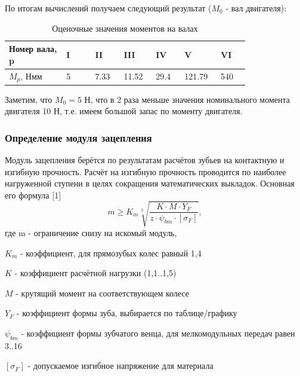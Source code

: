 \documentclass[14pt,a4paper,russian]{scrartcl}
\begin{document}
        По итогам вычислений получаем следующий результат (\( M_0 \) - вал двигателя):
        \begin{table}[h!]
            \begin{center}
                \begin{tabular}{p{0.2\linewidth}p{0.1\linewidth}p{0.1\linewidth}p{0.1\linewidth}p{0.1\linewidth}p{0.1\linewidth}p{0.1\linewidth}}
                    \hline
                    Номер вала, p & I & II & III & IV & V & VI \\
                    \hline
                    \( M_p \), Нмм & 5 & 7.33 & 11.52 & 29.4 & 121.79 & 540 \\
                    \hline
                \end{tabular}
                \caption{Оценочные значения моментов на валах}\label{tab:moments__shaft_estimate}
            \end{center}
        \end{table}

        Заметим, что \( M_0=5 \) Н, что в 2 раза меньше значения номинального момента двигателя 10 Н,
        т.е. имеем большой запас по моменту двигателя.

    \subsubsection{Определение модуля зацепления}
        Модуль зацепления берётся по результатам расчётов зубьев на контактную и
        изгибную прочность. Расчёт на изгибную прочность проводится по наиболее нагруженной ступени в целях
        сокращения математических выкладок. Основная его формула [1]
        \[ m \geq K_m\sqrt[3]{\frac{K\cdot M\cdot Y_F}{z\cdot\psi_{bm}\cdot[\sigma_F]}}, \]
        где m - ограничение снизу на искомый модуль,\par
            \( K_m \) - коэффициент, для прямозубых колес равный 1,4\par 
            \( K \) - коэффициент расчётной нагрузки (1,1..1,5)\par
            \( M \) - крутящий момент на соответствующем колесе\par
            \( Y_F \) - коэффициент формы зуба, выбирается по таблице/графику\par
            \( \psi_{bm} \) - коэффициент формы зубчатого венца, для мелкомодульных передач равен 3..16\par
            \( [\sigma_F] \) - допускаемое изгибное напряжение для материала\par
        
\end{document}
